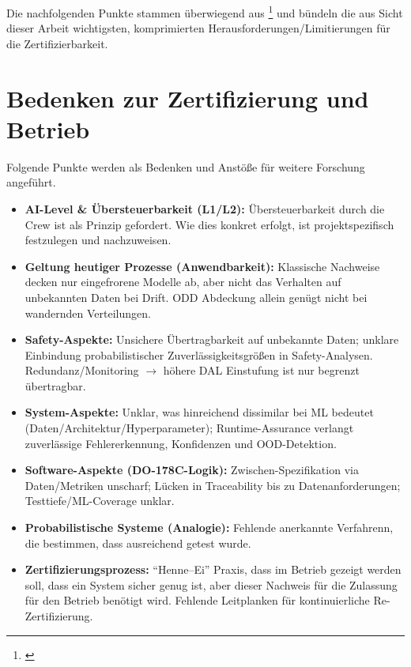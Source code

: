 Die nachfolgenden Punkte stammen überwiegend aus  
\footnote{ \parencite{ml-meets-aerospace-2024}} und bündeln 
die aus Sicht dieser Arbeit wichtigsten, komprimierten Herausforderungen/Limitierungen für die Zertifizierbarkeit.

\section{Bedenken zur Zertifizierung und Betrieb} \label{sec:bedenken_zertifizierung}
Folgende Punkte werden als Bedenken und Anstöße für weitere Forschung angeführt.

\medskip
\begin{itemize}
  \item \textbf{AI-Level \& Übersteuerbarkeit (L1/L2):}
        Übersteuerbarkeit durch die Crew ist als Prinzip gefordert. Wie dies konkret erfolgt, 
        ist projektspezifisch festzulegen und nachzuweisen.
  \item \textbf{Geltung heutiger Prozesse (Anwendbarkeit):}
        Klassische Nachweise decken nur eingefrorene Modelle ab, aber 
        nicht das Verhalten auf unbekannten Daten bei Drift. ODD Abdeckung allein genügt nicht bei wandernden Verteilungen.
  \item \textbf{Safety-Aspekte:}
        Unsichere Übertragbarkeit auf unbekannte Daten; unklare Einbindung probabilistischer Zuverlässigkeitsgrößen 
        in Safety-Analysen. Redundanz/Monitoring $\rightarrow$ höhere DAL Einstufung ist nur begrenzt übertragbar.
  \item \textbf{System-Aspekte:}
        Unklar, was hinreichend dissimilar bei ML bedeutet (Daten/Architektur/Hyperparameter); 
        Runtime-Assurance verlangt zuverlässige Fehlererkennung, Konfidenzen und OOD-Detektion.
  \item \textbf{Software-Aspekte (DO-178C-Logik):}
        Zwischen-Spezifikation via Daten/Metriken unscharf; Lücken in Traceability bis zu Datenanforderungen; Testtiefe/ML-Coverage unklar.
  \item \textbf{Probabilistische Systeme (Analogie):}
        Fehlende anerkannte Verfahrenn, die bestimmen, dass ausreichend getest wurde.
  \item \textbf{Zertifizierungsprozess:}
        ``Henne–Ei'' Praxis, dass im Betrieb gezeigt werden soll, dass ein System sicher genug ist, aber dieser Nachweis 
        für die Zulassung für den Betrieb benötigt wird.
        Fehlende Leitplanken für kontinuierliche Re-Zertifizierung.

\end{itemize}
